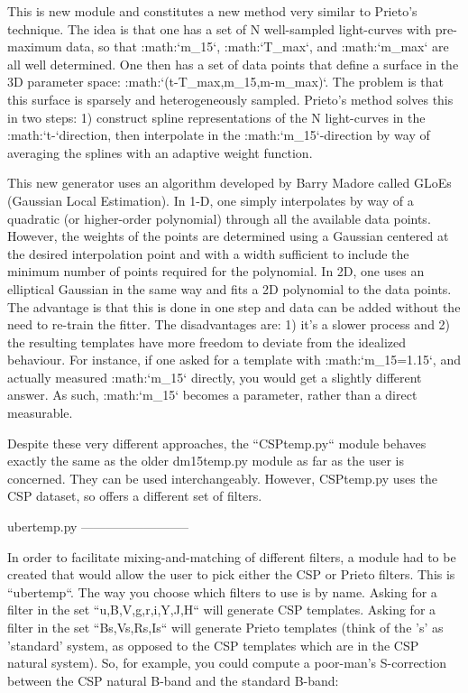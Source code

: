 This is new module and constitutes a new method very similar to Prieto's
technique. The idea is that one has a set of N well-sampled light-curves
with pre-maximum data, so that :math:`\Delta m_{15}`, :math:`T_{max}`, and :math:`m_{max}`
are all well determined. One then has a set of data points that define
a surface in the 3D parameter space: :math:`\left(t-T_{max},\Delta m_{15},m-m_{max}\right)`.
The problem is that this surface is sparsely and heterogeneously sampled.
Prieto's method solves this in two steps: 1) construct spline representations
of the N light-curves in the :math:`t-`direction, then interpolate in the
:math:`\Delta m_{15}`-direction by way of averaging the splines with an
adaptive weight function.

This new generator uses an algorithm developed by Barry Madore called
GLoEs (Gaussian Local Estimation). In 1-D, one simply interpolates
by way of a quadratic (or higher-order polynomial) through all the
available data points. However, the weights of the points are determined
using a Gaussian centered at the desired interpolation point and with
a width sufficient to include the minimum number of points required
for the polynomial. In 2D, one uses an elliptical Gaussian in the
same way and fits a 2D polynomial to the data points. The advantage
is that this is done in one step and data can be added without the
need to re-train the fitter. The disadvantages are: 1) it's a slower
process and 2) the resulting templates have more freedom to deviate
from the idealized behaviour. For instance, if one asked for a template
with :math:`\Delta m_{15}=1.15`, and actually measured :math:`\Delta m_{15}`
directly, you would get a slightly different answer. As such, :math:`\Delta m_{15}`
becomes a parameter, rather than a direct measurable.

Despite these very different approaches, the ``CSPtemp.py`` module
behaves exactly the same as the older dm15temp.py module as far as
the user is concerned. They can be used interchangeably. However,
CSPtemp.py uses the CSP dataset, so offers a different set of filters.


ubertemp.py
--------------------------

In order to facilitate mixing-and-matching of different filters, a
module had to be created that would allow the user to pick either
the CSP or Prieto filters. This is ``ubertemp``. The way you
choose which filters to use is by name. Asking for a filter in the
set ``u,B,V,g,r,i,Y,J,H`` will generate CSP templates. Asking
for a filter in the set ``Bs,Vs,Rs,Is`` will generate Prieto
templates (think of the 's' as 'standard' system, as opposed to the
CSP templates which are in the CSP natural system). So, for example,
you could compute a poor-man's S-correction between the CSP natural
B-band and the standard B-band:

